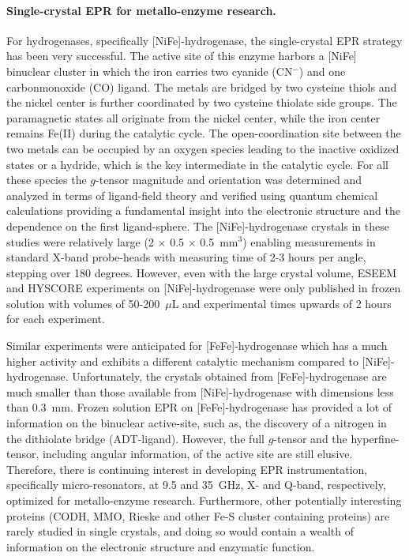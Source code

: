 \paragraph{Single-crystal EPR for metallo-enzyme research.}
For hydrogenases, specifically [NiFe]-hydrogenase, the single-crystal EPR strategy has been very successful. \cite{NiFe1996,NiFe2000, NiFe2003, NiFeRev2007} The active site of this enzyme harbors a [NiFe] binuclear cluster in which the iron carries two cyanide (CN$^-$) and one carbonmonoxide (CO) ligand. The metals are bridged by two cysteine thiols and the nickel center is further coordinated by two cysteine thiolate side groups. The paramagnetic states all originate from the nickel center, while the iron center remains Fe(II) during the catalytic cycle. \cite{lubitzhyd} The open-coordination site between the two metals can be occupied by an oxygen species leading to the inactive oxidized states or a hydride, which is the key intermediate in the catalytic cycle. \cite{NiFeRev2007} For all these species the $g$-tensor magnitude and orientation was determined and analyzed in terms of ligand-field theory and verified using quantum chemical calculations providing a fundamental insight into the electronic structure and the dependence on the first ligand-sphere. \cite{Ping2005, Gasteljp0573902, NiFeRev2007, LubitzNiFe2016} The [NiFe]-hydrogenase crystals in these studies were relatively large (2 $\times$ 0.5 $\times$ 0.5~mm$^3$) enabling measurements in standard X-band probe-heads with measuring time of 2-3 hours per angle, stepping over 180 degrees. However, even with the large crystal volume, ESEEM and HYSCORE experiments on [NiFe]-hydrogenase were only published in frozen solution with volumes of 50-200~$\mu$L and experimental times upwards of 2 hours for each experiment. \cite{NiFeRev2007} 

Similar experiments were anticipated for [FeFe]-hydrogenase which has a much higher activity and exhibits a different catalytic mechanism compared to [NiFe]-hydrogenase. Unfortunately, the crystals obtained from [FeFe]-hydrogenase are much smaller than those available from [NiFe]-hydrogenase with dimensions less than 0.3~mm. Frozen solution EPR on [FeFe]-hydrogenase has provided a lot of information on the binuclear active-site, such as, the discovery of a nitrogen in the dithiolate bridge (ADT-ligand). \cite{B905841A} However, the full $g$-tensor and the hyperfine-tensor, including angular information, of the active site are still elusive. Therefore, there is continuing interest in developing EPR instrumentation, specifically micro-resonators, at 9.5 and 35~GHz, X- and Q-band, respectively, optimized for metallo-enzyme research. Furthermore, other potentially interesting proteins (CODH\cite{C5CS00182J}, MMO\cite{Hoffman2014rev}, Rieske\cite{FERRARO2005175} and other Fe-S cluster containing proteins\cite{FeSClustersReview}) are rarely studied in single crystals, and doing so would contain a wealth of information on the electronic structure and enzymatic function. 

